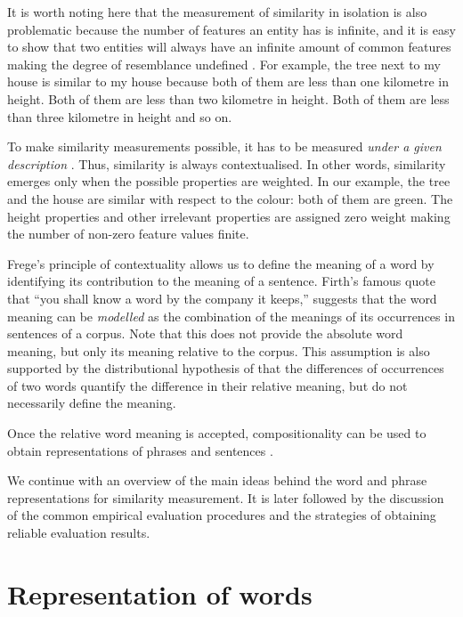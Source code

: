 It is worth noting here that the measurement of similarity in isolation is also problematic because the number of features an entity has is infinite, and it is easy to show that two entities will always have an infinite amount of common features making the degree of resemblance undefined \cite{goodman1972problems,hahn1997concepts}. For example, the tree next to my house is similar to my house because both of them are less than one kilometre in height. Both of them are less than two kilometre in height. Both of them are less than three kilometre in height and so on.

To make similarity measurements possible, it has to be measured \emph{under a given description} \cite{WCS:WCS1282,medin1993respects,Markman1996}. Thus, similarity is always contextualised. In other words, similarity emerges only when the possible properties are weighted. In our example, the tree and the house are similar with respect to the colour: both of them are green. The height properties and other irrelevant properties are assigned zero weight making the number of non-zero feature values finite.

Frege's principle of contextuality allows us to define the meaning of a word by identifying its contribution to the meaning of a sentence. Firth's \citeyearpar{firth1957lingtheory} famous quote that ``you shall know a word by the company it keeps,'' suggests that the word meaning can be \emph{modelled} as the combination of the meanings of its occurrences in sentences of a corpus. Note that this does not provide the absolute word meaning, but only its meaning relative to the corpus. This assumption is also supported by the distributional hypothesis of  that the differences of occurrences of two words quantify the difference in their relative meaning, but do not necessarily define the meaning.

Once the relative word meaning is accepted, compositionality can be used to obtain representations of phrases and sentences \cite{THEO:THEO373,Dowty1980,sep-montague-semantics,DBLP:journals/corr/abs-1003-4394,baroni2014frege}.

We continue with an overview of the main ideas behind the word and phrase representations for similarity measurement. It is later followed by the discussion of the common empirical evaluation procedures and the strategies of obtaining reliable evaluation results.

\section{Representation of words}
\label{sec:distr-hypoth}

